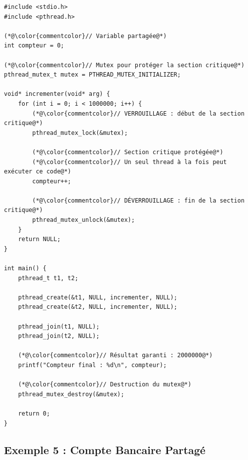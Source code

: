 \documentclass[11pt,a4paper]{article}
\begin{document}
\begin{lstlisting}[caption={Protection avec mutex}]
#include <stdio.h>
#include <pthread.h>

(*@\color{commentcolor}// Variable partagée@*)
int compteur = 0;

(*@\color{commentcolor}// Mutex pour protéger la section critique@*)
pthread_mutex_t mutex = PTHREAD_MUTEX_INITIALIZER;

void* incrementer(void* arg) {
    for (int i = 0; i < 1000000; i++) {
        (*@\color{commentcolor}// VERROUILLAGE : début de la section critique@*)
        pthread_mutex_lock(&mutex);
        
        (*@\color{commentcolor}// Section critique protégée@*)
        (*@\color{commentcolor}// Un seul thread à la fois peut exécuter ce code@*)
        compteur++;
        
        (*@\color{commentcolor}// DÉVERROUILLAGE : fin de la section critique@*)
        pthread_mutex_unlock(&mutex);
    }
    return NULL;
}

int main() {
    pthread_t t1, t2;
    
    pthread_create(&t1, NULL, incrementer, NULL);
    pthread_create(&t2, NULL, incrementer, NULL);
    
    pthread_join(t1, NULL);
    pthread_join(t2, NULL);
    
    (*@\color{commentcolor}// Résultat garanti : 2000000@*)
    printf("Compteur final : %d\n", compteur);
    
    (*@\color{commentcolor}// Destruction du mutex@*)
    pthread_mutex_destroy(&mutex);
    
    return 0;
}
\end{lstlisting}

\subsection{Exemple 5 : Compte Bancaire Partagé}
\end{document}
